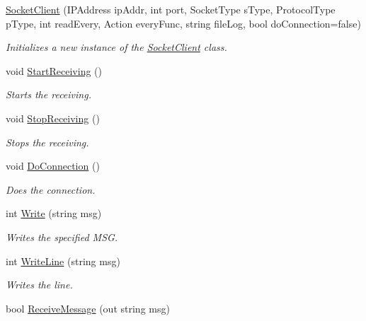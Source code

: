 \begin{DoxyCompactItemize}
\hyperlink{class_lerp2_a_p_i_1_1_communication_1_1_sockets_1_1_socket_client_a8612280f05e00348ec5c8adf5e7a416a}{Socket\+Client} (I\+P\+Address ip\+Addr, int port, Socket\+Type s\+Type, Protocol\+Type p\+Type, int read\+Every, Action every\+Func, string file\+Log, bool do\+Connection=false)
\begin{DoxyCompactList}\small\item\em Initializes a new instance of the \hyperlink{class_lerp2_a_p_i_1_1_communication_1_1_sockets_1_1_socket_client}{Socket\+Client} class. \end{DoxyCompactList}\item 
void \hyperlink{class_lerp2_a_p_i_1_1_communication_1_1_sockets_1_1_socket_client_ab5071c27cec345d839f551aa36b03624}{Start\+Receiving} ()
\begin{DoxyCompactList}\small\item\em Starts the receiving. \end{DoxyCompactList}\item 
void \hyperlink{class_lerp2_a_p_i_1_1_communication_1_1_sockets_1_1_socket_client_ad65ef824326213c3dfd05859f2ef4ac2}{Stop\+Receiving} ()
\begin{DoxyCompactList}\small\item\em Stops the receiving. \end{DoxyCompactList}\item 
void \hyperlink{class_lerp2_a_p_i_1_1_communication_1_1_sockets_1_1_socket_client_a87932ffacb6ed07b68e3036552707471}{Do\+Connection} ()
\begin{DoxyCompactList}\small\item\em Does the connection. \end{DoxyCompactList}\item 
int \hyperlink{class_lerp2_a_p_i_1_1_communication_1_1_sockets_1_1_socket_client_ae7feb72367cc1acb725658c8d053bff7}{Write} (string msg)
\begin{DoxyCompactList}\small\item\em Writes the specified M\+SG. \end{DoxyCompactList}\item 
int \hyperlink{class_lerp2_a_p_i_1_1_communication_1_1_sockets_1_1_socket_client_a809b07a3650c23ca8e7a6461be951bf8}{Write\+Line} (string msg)
\begin{DoxyCompactList}\small\item\em Writes the line. \end{DoxyCompactList}\item 
bool \hyperlink{class_lerp2_a_p_i_1_1_communication_1_1_sockets_1_1_socket_client_aa687a95a9fe088832a74333cb2b300a9}{Receive\+Message} (out string msg)

\end{DoxyCompactItemize}
